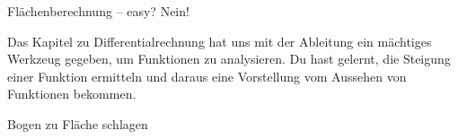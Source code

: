 \documentclass[../../main.tex]{subfiles}
\begin{document}
Flächenberechnung -- easy? Nein!

\begin{example}{}
    
\end{example}

Das Kapitel zu Differentialrechnung hat uns mit der Ableitung ein mächtiges Werkzeug gegeben, um Funktionen zu analysieren. Du hast gelernt, die Steigung einer Funktion ermitteln und daraus eine Vorstellung vom Aussehen von Funktionen bekommen.

Bogen zu Fläche schlagen
\end{document}
